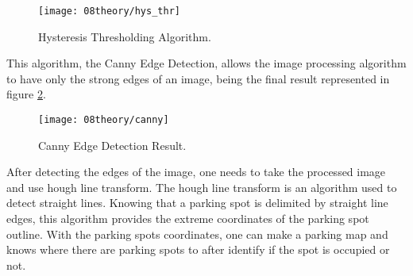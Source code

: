 \begin{figure}[H]
	\centering
	\texttt{[image: 08theory/hys\_thr]}
	\caption{Hysteresis Thresholding Algorithm.}
	\label{fig:hys_thr}
\end{figure}

This algorithm, the Canny Edge Detection, allows the image processing algorithm to have only the strong edges of an image, being the final result represented in figure \ref{fig:canny}.

\begin{figure}[H]
	\centering
	\texttt{[image: 08theory/canny]}
	\caption{Canny Edge Detection Result.}
	\label{fig:canny}
\end{figure}




After detecting the edges of the image, one needs to take the processed image and use hough line transform. The hough line transform \cite{hough} is an algorithm used to detect straight lines. Knowing that a parking spot is delimited by straight line edges, this algorithm provides the extreme coordinates of the parking spot outline. With the parking spots coordinates, one can make a parking map and knows where there are parking spots to after identify if the spot is occupied or not.




